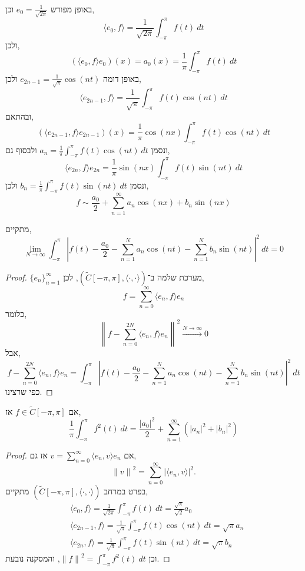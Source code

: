 \begin{remark}
	באופן מפורש $e_0 = \frac{1}{\sqrt{2 \pi}}$ וכן,
	\[
		\langle e_0, f \rangle = \frac{1}{\sqrt{2 \pi}} \int_{-\pi}^{\pi} f(t)\ dt
	\]
	ולכן,
	\[
		(\langle e_0, f \rangle e_0)(x)
		= a_0(x)
		= \frac{1}{\pi} \int_{-\pi}^{\pi} f(t)\ dt
	\]
	באופן דומה $e_{2n - 1} = \frac{1}{\sqrt{\pi}} \cos(nt)$ ולכן,
	\[
		\langle e_{2n - 1}, f \rangle
		= \frac{1}{\sqrt{\pi}} \int_{-\pi}^{\pi} f(t) \cos(nt)\ dt
	\]
	ובהתאם,
	\[
		(\langle e_{2n - 1}, f \rangle e_{2n - 1})(x)
		= \frac{1}{\pi} \cos(nx) \int_{-\pi}^{\pi} f(t) \cos(nt)\ dt
	\]
	ונסמן $a_n = \frac{1}{\pi} \int_{-\pi}^{\pi} f(t) \cos(nt)\ dt$
	ולבסוף גם,
	\[
		\langle e_{2n}, f \rangle e_{2n}
		= \frac{1}{\pi} \sin(nx) \int_{-\pi}^{\pi} f(t) \sin(nt)\ dt
	\]
	ונסמן $b_n = \frac{1}{\pi} \int_{-\pi}^{\pi} f(t) \sin(nt)\ dt$
	ולכן,
	\[
		f \sim \frac{a_0}{2} + \sum_{n = 1}^\infty a_n \cos(nx) + b_n \sin(nx)
	\]
\end{remark}
\begin{conclusion}
	מתקיים,
	\[
		\lim_{N \to \infty} 
		\int_{-\pi}^{\pi} {\left\lvert f(t) - \frac{a_0}{2} - \sum_{n = 1}^N a_n \cos(nt) - \sum_{n = 1}^N b_n \sin(nt) \right\rvert}^2\ dt
		= 0
	\]
\end{conclusion}
\begin{proof}
	${\{ e_n \}}_{n = 1}^\infty$ מערכת שלמה ב־$(\tilde{C}[-\pi, \pi], \langle \cdot, \cdot \rangle)$,
	לכן,
	\[
		f = \sum_{n = 0}^\infty \langle e_n, f \rangle e_n
	\]
	כלומר,
	\[
		{\left\lVert f - \sum_{n = 0}^{2N} \langle e_n, f \rangle e_n \right\rVert}^2
		\xrightarrow{N \to \infty} 0
	\]
	אבל,
	\[
		f - \sum_{n = 0}^{2N} \langle e_n, f \rangle e_n
		= \int_{-\pi}^{\pi} {\left\lvert f(t) - \frac{a_0}{2} - \sum_{n = 1}^N a_n \cos(nt) - \sum_{n = 1}^N b_n \sin(nt) \right\rvert}^2\ dt
	\]
	כפי שרצינו.
\end{proof}
\begin{conclusion}
	אם $f \in \tilde{C}[-\pi, \pi]$ אז,
	\[
		\frac{1}{\pi} \int_{-\pi}^{\pi} f^2(t)\ dt
		= \frac{{|a_0|}^2}{2} + \sum_{n = 1}^\infty ({| a_n |}^2 + {| b_n |}^2)
	\]
\end{conclusion}
\begin{proof}
	אם $v = \sum_{n = 0}^\infty \langle e_n, v \rangle e_n$ אז גם,
	\[
		{\lVert v \rVert}^2
		= \sum_{n = 0}^\infty {| \langle e_n, v \rangle |}^2
	.\]
	בפרט במרחב $(\tilde{C}[-\pi, \pi], \langle \cdot, \cdot \rangle)$ מתקיים,
	\begin{align*}
		& \langle e_0, f \rangle
		= \frac{1}{\sqrt{2 \pi}} \int_{-\pi}^{\pi} f(t)\ dt
		= \frac{\sqrt{\pi}}{\sqrt{2}} a_0 \\
		& \langle e_{2n - 1}, f \rangle
		= \frac{1}{\sqrt{\pi}} \int_{-\pi}^{\pi} f(t) \cos(n t)\ dt
		= \sqrt{\pi} a_n \\
		& \langle e_{2n}, f \rangle
		= \frac{1}{\sqrt{\pi}} \int_{-\pi}^{\pi} f(t) \sin(n t)\ dt
		= \sqrt{\pi} b_n
	\end{align*}
	וכן ${\lVert f \rVert}^2 = \int_{-\pi}^{\pi} f^2(t)\ dt$, והמסקנה נובעת.
\end{proof}

